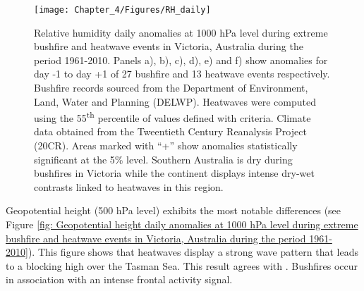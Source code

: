 \begin{figure}[h]
\noindent \begin{centering}
\texttt{[image: Chapter\_4/Figures/RH\_daily]}
\par\end{centering}

\caption[Relative humidity daily anomalies at 1000 hPa level during extreme
bushfire and heatwave events in Victoria, Australia during the period
1961-2010]{Relative humidity daily anomalies at 1000 hPa level during extreme
bushfire and heatwave events in Victoria, Australia during the period
1961-2010. Panels a), b), c), d), e) and f) show anomalies for day
-1 to day +1 of 27 bushfire and 13 heatwave events respectively. Bushfire
records sourced from the Department of Environment, Land, Water and
Planning (DELWP). Heatwaves were computed using the 55\protect\textsuperscript{th}
percentile of values defined with \citet{Nairn2009} criteria. Climate
data obtained from the Tweentieth Century Reanalysis Project (20CR).
Areas marked with ``+'' show anomalies statistically significant
at the 5\% level. Southern Australia is dry during bushfires in Victoria
while the continent displays intense dry-wet contrasts linked to heatwaves
in this region. \label{Relative humidity daily anomalies at 1000 hPa level during extreme bushfire and heatwave events in Victoria, Australia during the period 1961-2010}}
\end{figure}


Geopotential height (500 hPa level) exhibits the most notable differences
(see Figure \ref{fig: Geopotential height daily anomalies at 1000 hPa level during extreme bushfire and heatwave events in Victoria, Australia during the period 1961-2010}).
This figure shows that heatwaves display a strong wave pattern that
leads to a blocking high over the Tasman Sea. This result agrees with
\citet{Pezza2012}. Bushfires occur in association with an intense
frontal activity signal. 


